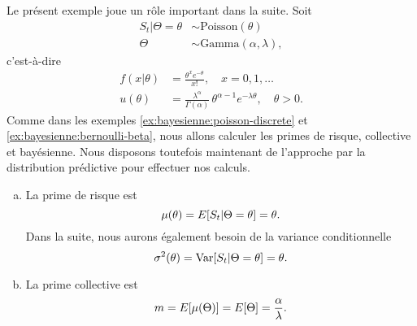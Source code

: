 \begin{exemple}
  \label{ex:bayesienne:poisson-gamma}
  Le présent exemple joue un rôle important dans la suite. Soit
  \begin{align*}
    S_t|\Theta = \theta &\sim \text{Poisson}(\theta) \\
                 \Theta &\sim \text{Gamma}(\alpha, \lambda),
  \end{align*}
  c'est-à-dire
  \begin{align*}
    f(x|\theta)
    &= \frac{\theta^x e^{-\theta}}{x!}, \quad x = 0, 1, \dots \\
    u(\theta)
    &= \frac{\lambda^\alpha}{\Gamma(\alpha)}\,
    \theta^{\alpha - 1} e^{-\lambda \theta}, \quad \theta > 0.
  \end{align*}
  Comme dans les exemples \ref{ex:bayesienne:poisson-discrete} et
  \ref{ex:bayesienne:bernoulli-beta}, nous allons calculer les primes
  de risque, collective et bayésienne. Nous disposons toutefois
  maintenant de l'approche par la distribution prédictive pour
  effectuer nos calculs.

  \begin{enumerate}[a)]
  \item La prime de risque est
    \begin{equation*}
      \mu(\theta) = E [ S_t|\Theta = \theta ] = \theta.
    \end{equation*}
    Dans la suite, nous aurons également besoin de la variance
    conditionnelle
    \begin{equation*}
      \sigma^2(\theta) = \operatorname{Var} [ S_t|\Theta = \theta ] = \theta.
    \end{equation*}

  \item La prime collective est
    \begin{equation*}
      m = E [ \mu(\Theta) ] = E [ \Theta ] = \frac{\alpha}{\lambda}.
    \end{equation*}


\end{enumerate}
\end{exemple}
